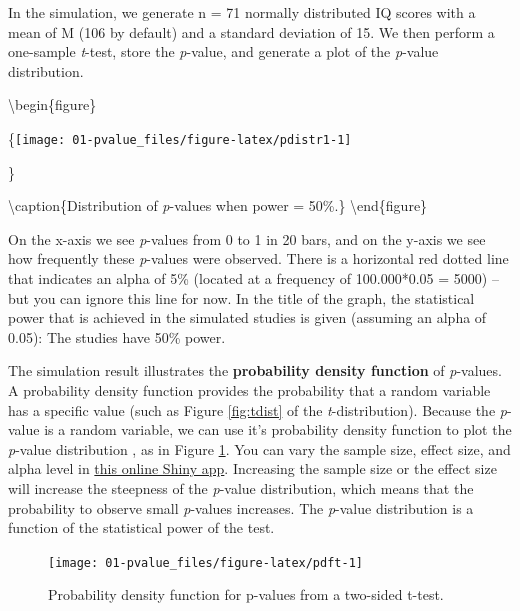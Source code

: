 \documentclass[
  oneside]{book}
\begin{document}
In the simulation, we generate n = 71 normally distributed IQ scores with a mean of M (106 by default) and a standard deviation of 15. We then perform a one-sample \emph{t}-test, store the \emph{p}-value, and generate a plot of the \emph{p}-value distribution.

\textbackslash begin\{figure\}

\{\centering \texttt{[image: 01-pvalue\_files/figure-latex/pdistr1-1]}

\}

\textbackslash caption\{Distribution of \emph{p}-values when power = 50\%.\}\label{fig:pdistr1}
\textbackslash end\{figure\}

On the x-axis we see \emph{p}-values from 0 to 1 in 20 bars, and on the y-axis we see how frequently these \emph{p}-values were observed. There is a horizontal red dotted line that indicates an alpha of 5\% (located at a frequency of 100.000*0.05 = 5000) -- but you can ignore this line for now. In the title of the graph, the statistical power that is achieved in the simulated studies is given (assuming an alpha of 0.05): The studies have 50\% power.

The simulation result illustrates the \textbf{probability density function} of \emph{p}-values. A probability density function provides the probability that a random variable has a specific value (such as Figure \ref{fig:tdist} of the \emph{t}-distribution). Because the \emph{p}-value is a random variable, we can use it's probability density function to plot the \emph{p}-value distribution \citep{hung_behavior_1997, ulrich_properties_2018}, as in Figure \ref{fig:pdft}. You can vary the sample size, effect size, and alpha level in \href{http://shiny.ieis.tue.nl/d_p_power/}{this online Shiny app}. Increasing the sample size or the effect size will increase the steepness of the \emph{p}-value distribution, which means that the probability to observe small \emph{p}-values increases. The \emph{p}-value distribution is a function of the statistical power of the test.

\begin{figure}

{\centering \texttt{[image: 01-pvalue\_files/figure-latex/pdft-1]} 

}

\caption{Probability density function for p-values from a two-sided t-test.}\label{fig:pdft}
\end{figure}
\end{document}
